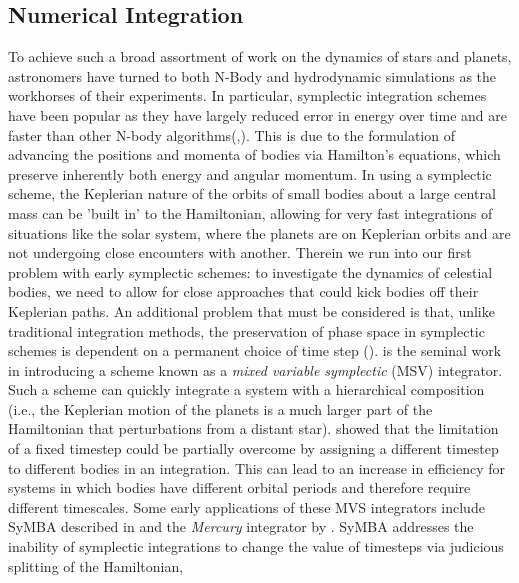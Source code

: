\documentclass[manuscript]{aastex631}
\begin{document}
\subsection{Numerical Integration}
To achieve such a broad assortment of work on the dynamics of stars and planets, astronomers have turned to both N-Body and hydrodynamic simulations as the workhorses
of their experiments.
In particular, symplectic integration schemes have been popular as they have largely reduced error in energy over time and are 
faster than other N-body algorithms(\cite{cha99},\cite{sah92}).
This is due to the formulation of advancing the positions and momenta of bodies via Hamilton's equations, which preserve inherently 
both energy and angular momentum. In using a
symplectic scheme, the Keplerian nature of the orbits of small bodies about a large central mass can be 'built in' to the Hamiltonian, allowing for very fast integrations
of situations like the solar system, where the planets are on Keplerian orbits and are not undergoing close encounters with another. 
Therein we run into our first problem with early symplectic schemes: to investigate the dynamics of celestial bodies, we need to allow for close approaches
that could kick bodies off their Keplerian paths. An additional problem that must be considered is that, unlike traditional integration methods,
the preservation of phase space in symplectic schemes is dependent on a permanent choice of time step (\cite{lee97conf}).
\cite{wis91} is the seminal work in introducing a  scheme known as a \textit{mixed variable symplectic} (MSV) integrator. Such a scheme can quickly integrate
a system with a hierarchical composition (i.e., the Keplerian motion of the planets is a much larger part of the Hamiltonian that perturbations from a distant star).
\cite{sah94} showed that the limitation of a fixed timestep could be partially overcome by assigning a different timestep to different bodies in an integration. This
can lead to an increase in efficiency for systems in which bodies have different orbital periods and therefore require different timescales. 
\indent Some early applications of these MVS integrators include SyMBA described in \cite{dun98} and the \textit{Mercury} 
integrator by \cite{cha99}. SyMBA addresses the inability of symplectic integrations to change the value of timesteps via judicious splitting of the Hamiltonian,
\end{document}
